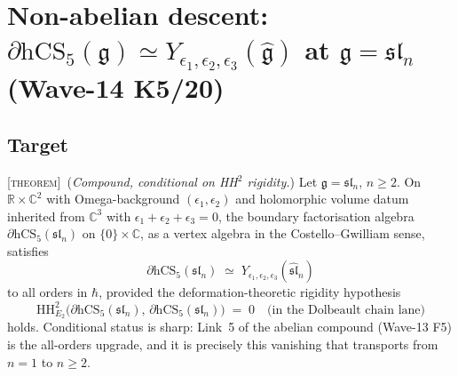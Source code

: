 
\providecommand{\ClaimStatusTheorem}{\textsc{[theorem]}}
\providecommand{\ClaimStatusConjectured}{\textsc{[conjectural]}}
\providecommand{\ClaimStatusDefinition}{\textsc{[definition]}}
\providecommand{\kch}{\kappa_{\mathrm{ch}}}
\providecommand{\kcat}{\kappa_{\mathrm{cat}}}
\providecommand{\kBKM}{\kappa_{\mathrm{BKM}}}
\providecommand{\hCS}{\mathrm{hCS}}
\providecommand{\Obs}{\mathrm{Obs}}
\providecommand{\Def}{\mathrm{Def}}
\providecommand{\HH}{\mathrm{HH}}
\providecommand{\Yaff}{Y_{\epsilon_1,\epsilon_2,\epsilon_3}}
\providecommand{\gghone}{\widehat{\mathfrak{gl}}_1}
\providecommand{\ghhat}{\widehat{\mathfrak{g}}}
\providecommand{\glnhat}{\widehat{\mathfrak{gl}}_n}
\providecommand{\slnhat}{\widehat{\mathfrak{sl}}_n}
\providecommand{\WLMN}{\mathcal{Y}_{L,M,N}}
\providecommand{\Wilpha}{\mathcal{W}_{1+\infty}}
\providecommand{\Omegabg}{\Omega}
\providecommand{\C}{\mathbb{C}}
\providecommand{\R}{\mathbb{R}}
\providecommand{\cO}{\mathcal{O}}
\providecommand{\cV}{\mathcal{V}}
\providecommand{\cY}{\mathcal{Y}}
\providecommand{\g}{\mathfrak{g}}
\providecommand{\sln}{\mathfrak{sl}_n}
\providecommand{\uone}{\mathfrak{u}(1)}
\providecommand{\dbar}{\bar\partial}

\section{Non-abelian descent: $\partial\hCS_5(\g) \simeq \Yaff(\ghhat)$
  at $\g=\sln$ (Wave-14 K5/20)}
\label{wn:sec:wave14-k5-nonabelian-descent}

\subsection{Target}

\ClaimStatusTheorem\ (\emph{Compound, conditional on HH${}^2$ rigidity.})
Let $\g=\sln$, $n\ge 2$. On $\R\times\C^2$ with Omega-background
$(\epsilon_1,\epsilon_2)$ and holomorphic volume datum inherited from
$\C^3$ with $\epsilon_1+\epsilon_2+\epsilon_3=0$, the boundary
factorisation algebra $\partial\hCS_5(\sln)$ on $\{0\}\times\C$, as
a vertex algebra in the Costello--Gwilliam sense, satisfies
\[
  \partial\hCS_5(\sln)
  \;\simeq\;
  \Yaff(\slnhat)
\]
to all orders in $\hbar$, provided the deformation-theoretic rigidity
hypothesis
\[
  \HH^2_{E_2}\!\bigl(\partial\hCS_5(\sln),\,\partial\hCS_5(\sln)\bigr)
  \;=\;0
  \quad\text{(in the Dolbeault chain lane)}
\]
holds. Conditional status is sharp: Link~5 of the abelian compound
(Wave-13 F5) is the all-orders upgrade, and it is precisely this
vanishing that transports from $n=1$ to $n\ge 2$.

